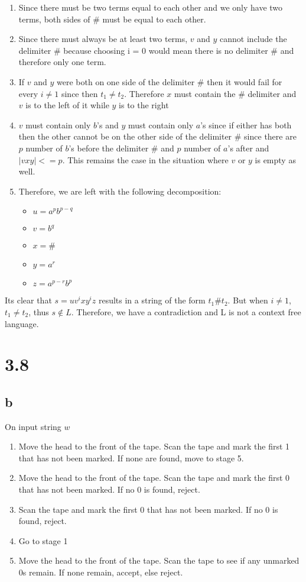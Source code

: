 \documentclass{article}
\begin{document}
\begin{enumerate}
    \item Since there must be two terms equal to each other and we only have two terms, both sides of $\#$ must be equal to each other.
    \item Since there must always be at least two terms, $v$ and $y$ cannot include the delimiter $\#$ because choosing i = 0 would mean there is no delimiter $\#$ and therefore only one term.
    \item If $v$ and $y$ were both on one side of the delimiter $\#$ then it would fail for every $i \neq 1$ since then $t_1 \neq t_2$. Therefore $x$ must contain the $\#$ delimiter and $v$ is to the left of it while $y$ is to the right
    \item $v$ must contain only $b$'s and $y$ must contain only $a$'s since if either has both then the other cannot be on the other side of the delimiter $\#$ since there are $p$ number of $b$'s before the delimiter $\#$ and $p$ number of $a$'s after and $|vxy| <= p$. This remains the case in the situation where $v$ or $y$ is empty as well.
    \item Therefore, we are left with the following decomposition: 
    \begin{itemize}
    	\item $u = a^p b^{p-q}$
	\item $v = b^q $
	\item $x = \#$
	\item $y = a^{r}$
	\item $z = a^{p-r}b^p$
    \end{itemize}
\end{enumerate}
Its clear that $s=uv^ixy^iz$ results in a string of the form $t_1 \# t_2$. But when $i \neq 1$, $t_1 \neq t_2$, thus $s \notin L$. Therefore, we have a contradiction and L is not a context free language.

\section*{3.8}
\subsection*{b}
On input string $w$
\begin{enumerate}
    \item Move the head to the front of the tape. Scan the tape and mark the first 1 that has not been marked. If none are found, move to stage 5.
    \item Move the head to the front of the tape. Scan the tape and mark the first 0 that has not been marked. If no 0 is found, reject. 
    \item Scan the tape and mark the first 0 that has not been marked. If no 0 is found, reject.
    \item Go to stage 1
    \item Move the head to the front of the tape. Scan the tape to see if any unmarked 0s remain. If none remain, accept, else reject. 
\end{enumerate}
\end{document}
